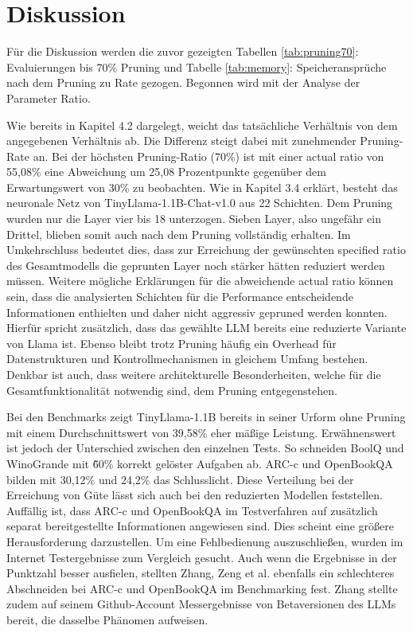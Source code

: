 \section{Diskussion}

Für die Diskussion werden die zuvor gezeigten Tabellen \ref{tab:pruning70}:
Evaluierungen bis 70\% Pruning und Tabelle \ref{tab:memory}: Speicheransprüche
nach dem Pruning zu Rate gezogen. Begonnen wird mit der Analyse der Parameter
Ratio.

Wie bereits in Kapitel 4.2 dargelegt, weicht das tatsächliche Verhältnis von dem
angegebenen Verhältnis ab. Die Differenz steigt dabei mit zunehmender
Pruning-Rate an. Bei der höchsten Pruning-Ratio (70\%) ist mit einer actual
ratio von 55,08\% eine Abweichung um 25,08 Prozentpunkte gegenüber dem
Erwartungswert von 30\% zu beobachten. Wie in Kapitel 3.4 erklärt, besteht das
neuronale Netz von TinyLlama-1.1B-Chat-v1.0 aus 22 Schichten. Dem Pruning wurden
nur die Layer vier bis 18 unterzogen. Sieben Layer, also ungefähr ein Drittel,
blieben somit auch nach dem Pruning vollständig erhalten. Im Umkehrschluss
bedeutet dies, dass zur Erreichung der gewünschten specified ratio des
Gesamtmodells die geprunten Layer noch stärker hätten reduziert werden müssen.
Weitere mögliche Erklärungen für die abweichende actual ratio können sein, dass
die analysierten Schichten für die Performance entscheidende Informationen
enthielten und daher nicht aggressiv gepruned werden konnten. Hierfür spricht
zusätzlich, dass das gewählte LLM bereits eine reduzierte Variante von Llama
ist. Ebenso bleibt trotz Pruning häufig ein Overhead für Datenstrukturen und
Kontrollmechanismen in gleichem Umfang bestehen. Denkbar ist auch, dass weitere
architekturelle Besonderheiten, welche für die Gesamtfunktionalität notwendig
sind, dem Pruning entgegenstehen.

Bei den Benchmarks zeigt TinyLlama-1.1B bereits in seiner Urform ohne Pruning
mit einem Durchschnittswert von 39,58\% eher mäßige Leistung. Erwähnenswert ist
jedoch der Unterschied zwischen den einzelnen Tests. So schneiden BoolQ und
WinoGrande mit \~ 60\% korrekt gelöster Aufgaben ab. ARC-c und OpenBookQA bilden
mit 30,12\% und 24,2\% das Schlusslicht. Diese Verteilung bei der Erreichung von
Güte lässt sich auch bei den reduzierten Modellen feststellen. Auffällig ist,
dass ARC-c und OpenBookQA im Testverfahren auf zusätzlich separat
bereitgestellte Informationen angewiesen sind. Dies scheint eine größere
Herausforderung darzustellen. Um eine Fehlbedienung auszuschließen, wurden im
Internet Testergebnisse zum Vergleich gesucht. Auch wenn die Ergebnisse in der
Punktzahl besser ausfielen, stellten Zhang, Zeng et al. ebenfalls ein
schlechteres Abschneiden bei ARC-c und OpenBookQA im Benchmarking
fest.\autocite[Vgl.][S. 6]{zhang2024tinyllama} Zhang stellte zudem auf seinem
Github-Account Messergebnisse von Betaversionen des LLMs bereit, die dasselbe
Phänomen aufweisen.\autocite[Vgl.][]{zhang2023eval}

